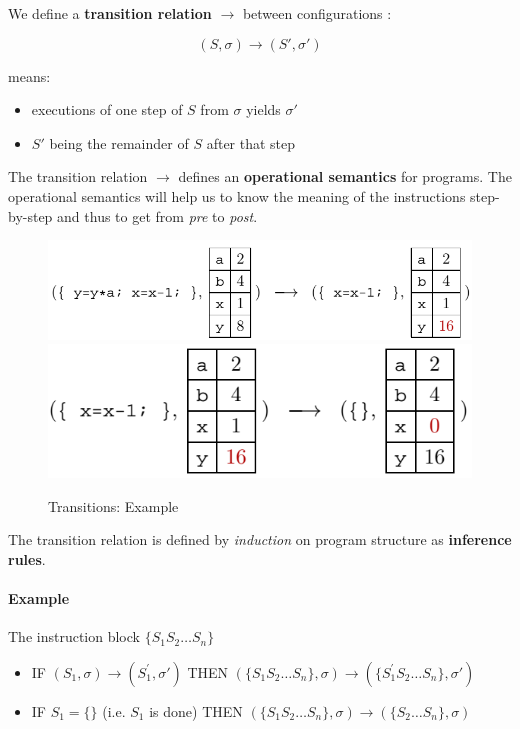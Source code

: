 \documentclass[12pt, a4paper]{book}
\begin{document}
We define a \textbf{transition relation} $\longrightarrow$ between
configurations :

$$(S,\sigma) \longrightarrow (S',\sigma')$$

means:

\begin{itemize}
    \item executions of one step of $S$ from $\sigma$ yields $\sigma'$
    \item $S'$ being the remainder of $S$ after that step
\end{itemize}

The transition relation $\longrightarrow$ defines an \textbf{operational
semantics} for programs. The operational semantics will help us to know the
meaning of the instructions step-by-step and thus to get from \textit{pre} to
\textit{post}.

\begin{figure}[!ht]
    \centering
    \includegraphics[width=0.8\linewidth]{transition1.png}
    \includegraphics[width=0.6\linewidth]{transition2.png}
    \caption{Transitions: Example}
\end{figure}

The transition relation is defined by \textit{induction} on program structure as
\textbf{inference rules}. \newline

\paragraph{Example} The instruction block $\{S_1 S_2 \ldots S_n\}$

\begin{itemize}
    \item IF $(S_1, \sigma) \longrightarrow (S_{1}^{'},\sigma')$ THEN
    $(\{S_1S_2\ldots S_n\}, \sigma) \longrightarrow (\{S_1^{'}S_2\ldots S_n\},\sigma')$
    \item IF $S_1 = \{\}$ (i.e. $S_1$ is done) THEN $(\{S_1S_2\ldots S_n\},\sigma) \longrightarrow (\{S_2\ldots S_n\}, \sigma)$
\end{itemize}
\end{document}
